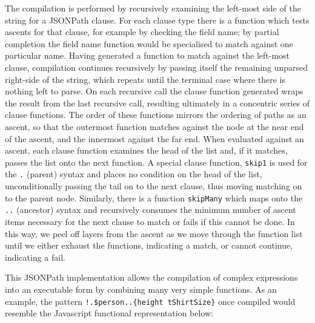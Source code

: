 \documentclass[12pt, ]{article}
\newenvironment{Shaded}{}{}
\newcommand{\StringTok}[1]{\textcolor[rgb]{0.25,0.44,0.63}{{#1}}}
\newcommand{\CommentTok}[1]{\textcolor[rgb]{0.38,0.63,0.69}{\textit{{#1}}}}
\newcommand{\FunctionTok}[1]{\textcolor[rgb]{0.02,0.16,0.49}{{#1}}}
\newcommand{\NormalTok}[1]{{#1}}
\begin{document}
The compilation is performed by recursively examining the left-most side
of the string for a JSONPath clause. For each clause type there is a
function which tests ascents for that clause, for example by checking
the field name; by partial completion the field name function would be
specialised to match against one particular name. Having generated a
function to match against the left-most clause, compilation continues
recursively by passing itself the remaining unparsed right-side of the
string, which repeats until the terminal case where there is nothing
left to parse. On each recursive call the clause function generated
wraps the result from the last recursive call, resulting ultimately in a
concentric series of clause functions. The order of these functions
mirrors the ordering of paths as an ascent, so that the outermost
function matches against the node at the near end of the ascent, and the
innermost against the far end. When evaluated against an ascent, each
clause function examines the head of the list and, if it matches, passes
the list onto the next function. A special clause function,
\texttt{skip1} is used for the \texttt{.} (parent) syntax and places no
condition on the head of the list, unconditionally passing the tail on
to the next clause, thus moving matching on to the parent node.
Similarly, there is a function \texttt{skipMany} which maps onto the
\texttt{..} (ancestor) syntax and recursively consumes the minimum
number of ascent items necessary for the next clause to match or fails
if this cannot be done. In this way, we peel off layers from the ascent
as we move through the function list until we either exhaust the
functions, indicating a match, or cannot continue, indicating a fail.

This JSONPath implementation allows the compilation of complex
expressions into an executable form by combining many very simple
functions. As an example, the pattern
\texttt{!.\$person..\{height tShirtSize\}} once compiled would resemble
the Javascript functional representation below:

\begin{Shaded}
\end{Shaded}
\end{document}
